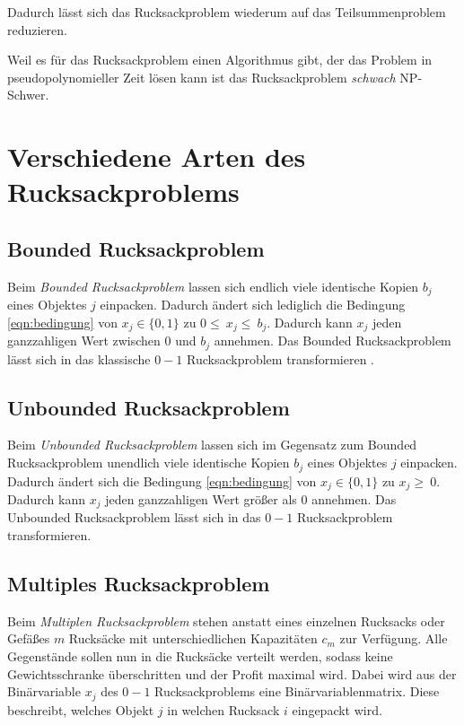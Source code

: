\noindent Dadurch lässt sich das Rucksackproblem wiederum auf das Teilsummenproblem reduzieren. 

Weil es für das Rucksackproblem einen Algorithmus gibt, der das Problem in pseudopolynomieller Zeit lösen kann
ist das Rucksackproblem \textit{schwach} NP-Schwer.

\section{Verschiedene Arten des Rucksackproblems}
\subsection{Bounded Rucksackproblem}
Beim \textit{Bounded Rucksackproblem} lassen sich endlich viele identische Kopien $b_j$ eines Objektes $j$ einpacken. Dadurch ändert sich lediglich die Bedingung \ref{eqn:bedingung} von $x_j\in\{0,1\}$ zu $0\le\ x_j\le\ b_j$. Dadurch kann $x_j$ jeden ganzzahligen Wert zwischen $0$ und $b_j$ annehmen. \cite[vgl.][]{Martello1990} 
Das Bounded Rucksackproblem lässt sich in das klassische $0-1$ Rucksackproblem transformieren \cite[vgl.][]{Schury2013}.
\subsection{Unbounded Rucksackproblem}
Beim \textit{Unbounded Rucksackproblem} lassen sich im Gegensatz zum Bounded Rucksackproblem unendlich viele identische Kopien $b_j$ eines Objektes $j$ einpacken. 
Dadurch ändert sich die Bedingung \ref{eqn:bedingung} von $x_j\in\{0,1\}$ zu $x_j\geq\ 0$. Dadurch kann $x_j$ jeden ganzzahligen Wert größer als $0$ annehmen.
Das Unbounded Rucksackproblem lässt sich in das $0-1$ Rucksackproblem transformieren. \cite[vgl.][]{Schury2013}
\subsection{Multiples Rucksackproblem}
Beim \textit{Multiplen Rucksackproblem} stehen anstatt eines einzelnen Rucksacks oder Gefäßes $m$ Rucksäcke mit unterschiedlichen Kapazitäten $c_m$ zur Verfügung. Alle Gegenstände sollen nun in die Rucksäcke verteilt werden, sodass keine Gewichtsschranke überschritten und der Profit maximal wird. Dabei wird aus der Binärvariable $x_j$ des $0-1$ Rucksackproblems eine Binärvariablenmatrix. Diese beschreibt, welches Objekt $j$ in welchen Rucksack $i$ eingepackt wird. \cite[vgl.][]{Martello1990}

